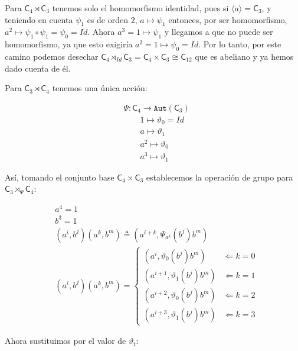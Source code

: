 \documentclass[12pt,a4paper,fleqn,spanish,final,openright]{extbook}
\theoremstyle{definition}
\theoremstyle{remark}
\begin{document}
Para $\mathsf{C}_{4}\rtimes\mathsf{C}_{3}$ tenemos solo el homomorfismo identidad, pues si
$\langle a\rangle=\mathsf{C}_{3}$, y teniendo en cuenta $\psi_1$ es de orden
$2$, $a    \mapsto \psi_1$ entonces, por ser homomorfismo,
$a^2    \mapsto \psi_1   \circ \psi_1=\psi_0=Id$. Ahora $a^3=1    \mapsto \psi_1$
y llegamos a que no puede ser homomorfismo, ya que esto exigiría $a^3=1    \mapsto \psi_0 = Id$.
Por lo tanto, por este camino podemos desechar
$\mathsf{C}_{4}\rtimes_{Id}\mathsf{C}_{3} =
\mathsf{C}_{4}   \times   \mathsf{C}_{3}   \cong    \mathsf{C}_{12}$
que es abeliano y ya hemos dado cuenta de él.

Para $\mathsf{C}_{3}\rtimes\mathsf{C}_{4}$ tenemos una única acción:

\begin{align*}
& \Psi : \mathsf{C}_{4}    \longrightarrow    \texttt{Aut}\left( \mathsf{C}_{3} \right) \\
& \qquad        1				\mapsto		{\vartheta }_0 = Id \\
& \qquad		a				\mapsto		{\vartheta }_1 \\
& \qquad		a^2				\mapsto		{\vartheta }_0 \\
& \qquad		a^3				\mapsto		{\vartheta }_1
\end{align*}

Así, tomando el conjunto base $\mathsf{C}_{4}   \times   \mathsf{C}_{3}$ establecemos la
operación de grupo para $\mathsf{C}_{3}\rtimes_{\Psi } \mathsf{C}_{4}$:

\begin{align*}
& a^4=1 \\
& b^3=1 \\
& (a^i,b^j)(a^k,b^m) \triangleq (a^{i+k} ,{\Psi }_{a^k}(b^j) {b^{m}}) \\
&
(a^i,b^j)(a^k,b^m) =
	\begin{cases}
		\left( a^{i  } , \vartheta_0(b^{j}){b^m} \right)   &   \Leftarrow    k=0\\
		\left( a^{i+1} , \vartheta_1(b^{j}){b^m} \right)   &   \Leftarrow    k=1\\
		\left( a^{i+2} , \vartheta_0(b^{j}){b^m} \right)   &   \Leftarrow    k=2\\
		\left( a^{i+3} , \vartheta_1(b^{j}){b^m} \right)   &   \Leftarrow    k=3
	\end{cases}
\end{align*}

Ahora sustituimos por el valor de $\vartheta_t$:
\end{document}
